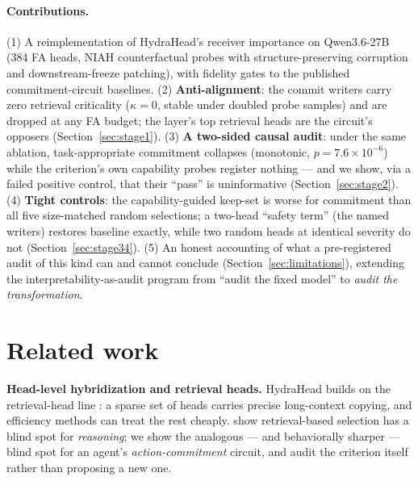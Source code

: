 \documentclass[11pt]{article}
\begin{document}
\paragraph{Contributions.}
(1) A reimplementation of HydraHead's receiver importance on Qwen3.6-27B (384 FA heads, NIAH counterfactual
probes with structure-preserving corruption and downstream-freeze patching), with fidelity gates to the
published commitment-circuit baselines.
(2) \textbf{Anti-alignment}: the commit writers carry zero retrieval criticality ($\kappa{=}0$, stable under
doubled probe samples) and are dropped at any FA budget; the layer's top retrieval heads are the circuit's
opposers (Section~\ref{sec:stage1}).
(3) \textbf{A two-sided causal audit}: under the same ablation, task-appropriate commitment collapses
(monotonic, $p{=}7.6{\times}10^{-6}$) while the criterion's own capability probes register nothing ---
and we show, via a failed positive control, that their ``pass'' is uninformative
(Section~\ref{sec:stage2}).
(4) \textbf{Tight controls}: the capability-guided keep-set is worse for commitment than all five
size-matched random selections; a two-head ``safety term'' (the named writers) restores baseline exactly,
while two random heads at identical severity do not (Section~\ref{sec:stage34}).
(5) An honest accounting of what a pre-registered audit of this kind can and cannot conclude
(Section~\ref{sec:limitations}), extending the interpretability-as-audit program from ``audit the fixed
model'' to \emph{audit the transformation}.

\section{Related work}

\textbf{Head-level hybridization and retrieval heads.} HydraHead \citep{tan2026hydrahead} builds on the
retrieval-head line \citep{wu2024retrieval,xiao2024duo,tang2024razor}: a sparse set of heads carries
precise long-context copying, and efficiency methods can treat the rest cheaply.
\citet{du2025rlkv} show retrieval-based selection has a blind spot for \emph{reasoning}; we show the
analogous --- and behaviorally sharper --- blind spot for an agent's \emph{action-commitment} circuit,
and audit the criterion itself rather than proposing a new one.
\end{document}
